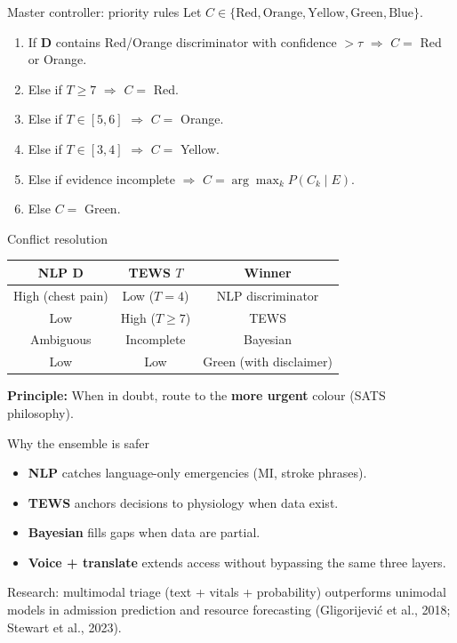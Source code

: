 \documentclass[aspectratio=169,11pt]{beamer}
\newcommand{\bcol}[2][blue!70!black]{\textcolor{#1}{#2}}
\begin{document}
\begin{frame}{Master controller: priority rules}
	Let $C \in \{\text{Red}, \text{Orange}, \text{Yellow}, \text{Green}, \text{Blue}\}$.

	\vspace{0.2em}
	\small
	\begin{enumerate}
		\item If $\mathbf{D}$ contains Red/Orange discriminator with confidence $> \tau$ $\Rightarrow$ $C =$ Red or Orange.
		\item Else if $T \geq 7$ $\Rightarrow$ $C =$ Red.
		\item Else if $T \in [5,6]$ $\Rightarrow$ $C =$ Orange.
		\item Else if $T \in [3,4]$ $\Rightarrow$ $C =$ Yellow.
		\item Else if evidence incomplete $\Rightarrow$ $C = \arg\max_k P(C_k \mid E)$.
		\item Else $C =$ Green.
	\end{enumerate}
\end{frame}

\begin{frame}{Conflict resolution}
	\begin{center}
		\begin{tabular}{@{}ccc@{}}
			\toprule
			NLP $\mathbf{D}$ & TEWS $T$ & \textbf{Winner} \\
			\midrule
			High (chest pain) & Low ($T=4$) & \bcol[triageOrange]{NLP discriminator} \\
			Low & High ($T \geq 7$) & \bcol[triageRed]{TEWS} \\
			Ambiguous & Incomplete & \bcol[triageRed]{Bayesian} \\
			Low & Low & Green (with disclaimer) \\
			\bottomrule
		\end{tabular}
	\end{center}

	\vspace{0.4em}
	\textbf{Principle:} When in doubt, route to the \textbf{more urgent} colour (SATS philosophy).
\end{frame}

\begin{frame}{Why the ensemble is safer}
	\begin{itemize}
		\item \textbf{NLP} catches language-only emergencies (MI, stroke phrases).
		\item \textbf{TEWS} anchors decisions to physiology when data exist.
		\item \textbf{Bayesian} fills gaps when data are partial.
		\item \textbf{Voice + translate} extends access without bypassing the same three layers.
	\end{itemize}

	\vspace{0.3em}
	Research: multimodal triage (text + vitals + probability) outperforms unimodal models in admission prediction and resource forecasting (Gligorijevi\'c et al., 2018; Stewart et al., 2023).
\end{frame}
\end{document}
